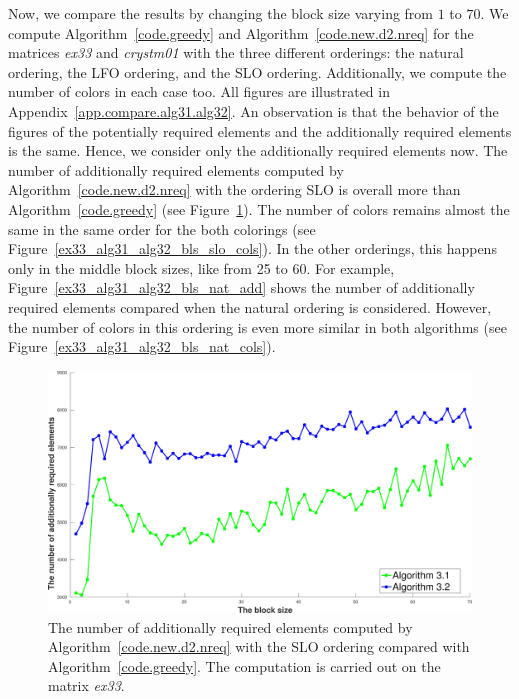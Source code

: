 \documentclass[12pt, twoside,a4paper,toc=bibliography]{scrbook}
\newcommand{\figref}[1]{Figure~\protect\ref{#1}}
\newcommand{\coderef}[1]{Algorithm~\protect\ref{#1}}
\newcommand{\appref}[1]{Appendix~\protect\ref{#1}}
\begin{document}
Now, we compare the results by changing the block size varying from $1$ to $70$.
We compute \coderef{code.greedy} and \coderef{code.new.d2.nreq} for the matrices \textit{ex33}
and \textit{crystm01} with the three different orderings: the natural ordering, the LFO ordering,
and the SLO ordering. Additionally, we compute the number of colors in each case too.
All figures are illustrated in \appref{app.compare.alg31.alg32}.
An observation is that the behavior of the figures of the potentially required elements and
the additionally required elements is the same. Hence, we consider only the additionally
required elements now.
The number of additionally required elements computed by \coderef{code.new.d2.nreq} with the ordering SLO
is overall more than \coderef{code.greedy} (see \figref{ex33_alg31_alg32_bls_slo_add}).
The number of colors remains almost the same in the same order for the both colorings 
(see \figref{ex33_alg31_alg32_bls_slo_cols}). 
In the other orderings, this happens only in the middle block sizes, like from 25 to 60.
For example, \figref{ex33_alg31_alg32_bls_nat_add} shows the number of additionally required elements
compared when the natural ordering is considered.
However, the number of colors in this ordering is even more similar in both algorithms
(see \figref{ex33_alg31_alg32_bls_nat_cols}).

\begin{figure}
\centering
\includegraphics[width=0.9\linewidth]{ex33_alg31_alg32_bls_slo_add}
\caption{
The number of additionally required elements computed by
\coderef{code.new.d2.nreq} with the SLO ordering
compared with \coderef{code.greedy}.
The computation is carried out on the matrix \textit{ex33}. }
\label{ex33_alg31_alg32_bls_slo_add}
\end{figure}
\end{document}
